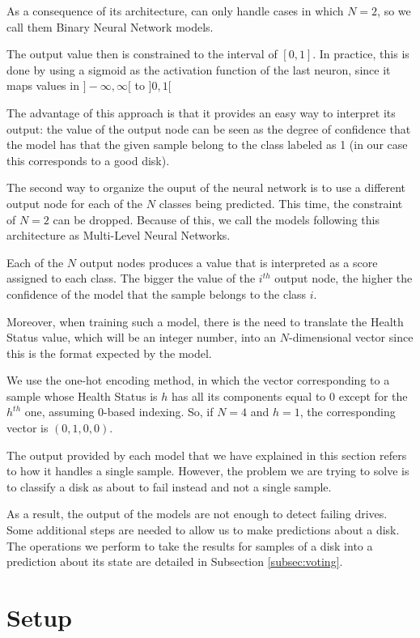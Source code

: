 As a consequence of its architecture, can only handle cases in which $N = 2$, so we call them Binary Neural Network models.

The output value then is constrained to the interval of $[0,1]$.
In practice, this is done by using a sigmoid as the activation function of the last neuron, since it maps values in $]-\infty,\infty[$ to $]0,1[$

The advantage of this approach is that it provides an easy way to interpret its output: the value of the output node can be seen as the degree of confidence that the model has that the given sample belong to the class labeled as 1 (in our case this corresponds to a good disk).

The second way to organize the ouput of the neural network is to use a different output node for each of the $N$ classes being predicted.
This time, the constraint of $N=2$ can be dropped.
Because of this, we call the models following this architecture as Multi-Level Neural Networks.

Each of the $N$ output nodes produces a value that is interpreted as a score assigned to each class.
The bigger the value of the $i^{th}$ output node, the higher the confidence of the model that the sample belongs to the class $i$.

Moreover, when training such a model, there is the need to translate the Health Status value, which will be an integer number, into an $N$-dimensional vector since this is the format expected by the model.

We use the one-hot encoding method, in which the vector corresponding to a sample whose Health Status is $h$ has all its components equal to 0 except for the $h^{th}$ one, assuming 0-based indexing.
So, if $N = 4$ and $h = 1$, the corresponding vector is $(0,1,0,0)$.

The output provided by each model that we have explained in this section refers to how it handles a single sample.
However, the problem we are trying to solve is to classify a disk as about to fail instead and not a single sample.

As a result, the output of the models are not enough to detect failing drives.
Some additional steps are needed to allow us to make predictions about a disk.
The operations we perform to take the results for samples of a disk into a prediction about its state are detailed in Subsection \ref{subsec:voting}.

\section{Setup}\label{sec:setup}


